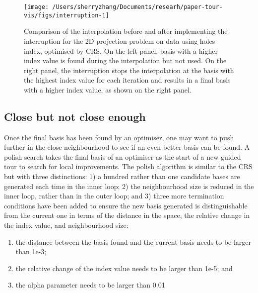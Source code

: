 \begin{Schunk}
\begin{figure}

{\centering \texttt{[image: /Users/sherryzhang/Documents/researh/paper-tour-vis/figs/interruption-1]} 

}

\caption[Comparison of the interpolation before and after implementing the interruption for the 2D projection problem on  data using holes index, optimised by CRS]{Comparison of the interpolation before and after implementing the interruption for the 2D projection problem on  data using holes index, optimised by CRS. On the left panel, basis with a higher index value is found during the interpolation but not used. On the right panel, the interruption stops the interpolation at the basis with the highest index value for each iteration and results in a final basis with a higher index value, as shown on the right panel.}\label{fig:interruption}
\end{figure}
\end{Schunk}

\hypertarget{close-but-not-close-enough}{%
\subsection{Close but not close
enough}\label{close-but-not-close-enough}}

Once the final basis has been found by an optimiser, one may want to
push further in the close neighbourhood to see if an even better basis
can be found. A polish search takes the final basis of an optimiser as
the start of a new guided tour to search for local improvements. The
polish algorithm is similar to the CRS but with three distinctions: 1) a
hundred rather than one candidate bases are generated each time in the
inner loop; 2) the neighbourhood size is reduced in the inner loop,
rather than in the outer loop; and 3) three more termination conditions
have been added to ensure the new basis generated is distinguishable
from the current one in terms of the distance in the space, the relative
change in the index value, and neighbourhood size:

\begin{enumerate}
\def\labelenumi{\arabic{enumi})}
\tightlist
\item
  the distance between the basis found and the current basis needs to be
  larger than 1e-3;
\item
  the relative change of the index value needs to be larger than 1e-5;
  and
\item
  the alpha parameter needs to be larger than 0.01
\end{enumerate}

